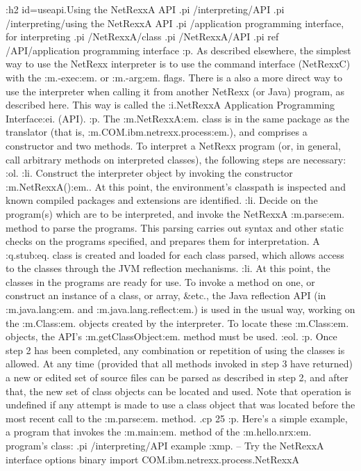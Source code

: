 :h2 id=useapi.Using the NetRexxA API
.pi /interpreting/API
.pi /interpreting/using the NetRexxA API
.pi /application programming interface, for interpreting
.pi /NetRexxA/class
.pi /NetRexxA/API
.pi ref /API/application programming interface
:p.
As described elsewhere, the simplest way to use the NetRexx interpreter
is to use the command interface (NetRexxC) with the :m.-exec:em.
or :m.-arg:em. flags.
There is a also a more direct way to use the interpreter when calling it
from another NetRexx (or Java) program, as described here.  This
way is called the :i.NetRexxA Application Programming Interface:ei.
(API).
:p.
The :m.NetRexxA:em. class is in the same package as the translator
(that is, :m.COM.ibm.netrexx.process:em.), and comprises a constructor
and two methods.  To interpret a NetRexx program (or, in general, call
arbitrary methods on interpreted classes), the following steps are
necessary:
:ol.
:li.
Construct the interpreter object by invoking the constructor :m.NetRexxA():em..
At this point, the environment's classpath is inspected and known
compiled packages and extensions are identified.
:li.
Decide on the program(s) which are to be interpreted, and invoke the
NetRexxA :m.parse:em. method to parse the programs.  This parsing
carries out syntax and other static checks on the programs specified,
and prepares them for interpretation.  A :q.stub:eq. class is created
and loaded for each class parsed, which allows access to the classes
through the JVM reflection mechanisms.
:li.
At this point, the classes in the programs are ready for use.  To invoke
a method on one, or construct an instance of a class, or array, &etc.,
the Java reflection API (in :m.java.lang:em. and :m.java.lang.reflect:em.)
is used in the usual way, working on the :m.Class:em. objects created by
the interpreter.  To locate these :m.Class:em. objects, the
API's :m.getClassObject:em. method must be used.
:eol.
:p.
Once step 2 has been completed, any combination or repetition of using
the classes is allowed.  At any time (provided that all methods invoked
in step 3 have returned) a new or edited set of source files can be
parsed as described in step 2, and after that, the new set of class
objects can be located and used.  Note that operation is undefined if
any attempt is made to use a class object that was located before the
most recent call to the :m.parse:em. method.
.cp 25
:p.
Here's a simple example, a program that invokes the :m.main:em. method
of the :m.hello.nrx:em. program's class:
.pi /interpreting/API example
:xmp.
-- Try the NetRexxA interface
options binary
import COM.ibm.netrexx.process.NetRexxA

